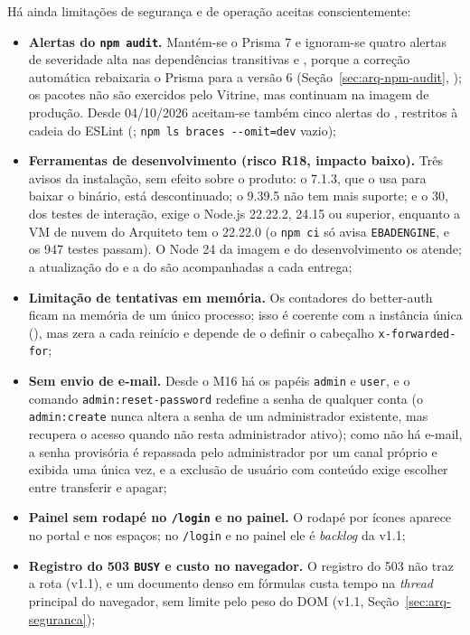 Há ainda limitações de segurança e de operação aceitas conscientemente:

\begin{itemize}
  \item \textbf{Alertas do \texttt{npm audit}.} Mantém-se o Prisma 7 e ignoram-se quatro alertas de severidade alta nas dependências transitivas  e , porque a correção automática rebaixaria o Prisma para a versão 6 (Seção~\ref{sec:arq-npm-audit}, ); os pacotes não são exercidos pelo Vitrine, mas continuam na imagem de produção. Desde 04/10/2026 aceitam-se também cinco alertas do , restritos à cadeia do ESLint (; \texttt{npm ls braces -{}-omit=dev} vazio);
  \item \textbf{Ferramentas de desenvolvimento (risco R18, impacto baixo).} Três avisos da instalação, sem efeito sobre o produto: o  7.1.3, que o  usa para baixar o binário, está descontinuado; o  9.39.5 não tem mais suporte; e o  30, dos testes de interação, exige o Node.js 22.22.2, 24.15 ou superior, enquanto a VM de nuvem do Arquiteto tem o 22.22.0 (o \texttt{npm ci} só avisa \texttt{EBADENGINE}, e os 947 testes passam). O Node 24 da imagem e do desenvolvimento os atende; a atualização do  e a do  são acompanhadas a cada entrega;
  \item \textbf{Limitação de tentativas em memória.} Os contadores do better-auth ficam na memória de um único processo; isso é coerente com a instância única (), mas zera a cada reinício e depende de o  definir o cabeçalho \texttt{x-forwarded-for};
  \item \textbf{Sem envio de e-mail.} Desde o M16 há os papéis \texttt{admin} e \texttt{user}, e o comando \texttt{admin:reset-password} redefine a senha de qualquer conta (o \texttt{admin:create} nunca altera a senha de um administrador existente, mas recupera o acesso quando não resta administrador ativo); como não há e-mail, a senha provisória é repassada pelo administrador por um canal próprio e exibida uma única vez, e a exclusão de usuário com conteúdo exige escolher entre transferir e apagar;
  \item \textbf{Painel sem rodapé no \texttt{/login} e no painel.} O rodapé por ícones aparece no portal e nos espaços; no \texttt{/login} e no painel ele é \emph{backlog} da v1.1;
  \item \textbf{Registro do 503 \texttt{BUSY} e custo no navegador.} O registro do 503 não traz a rota (v1.1), e um documento denso em fórmulas custa tempo na \emph{thread} principal do navegador, sem limite pelo peso do DOM (v1.1, Seção~\ref{sec:arq-seguranca});

\end{itemize}

